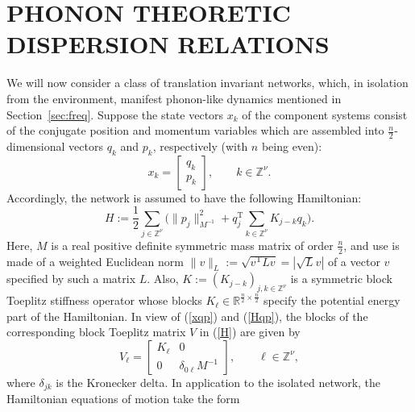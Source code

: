 \documentclass[letterpaper, 10pt, conference]{ieeeconf}  %
\def\mZ{\mathbb{Z}}    %
\def\mR{\mathbb{R}}    %
\def\rT{\mathrm{T}}        %
\def\x{\times}
\def\mZ{\mathbb{Z}}
\begin{document}
\section{PHONON THEORETIC
DISPERSION RELATIONS}\label{sec:phon}

We will now consider a class of translation invariant networks, which, in isolation from the environment, manifest phonon-like dynamics mentioned in Section~\ref{sec:freq}. Suppose the state vectors  $x_k$  of the component systems consist of the conjugate position and momentum variables which are assembled  into $\frac{n}{2}$-dimensional vectors $q_k$ and $p_k$, respectively (with $n$ being even):
\begin{equation}
\label{xqp}
    x_k
    =
    \begin{bmatrix}
        q_k\\
        p_k
    \end{bmatrix},
    \qquad
    k \in \mZ^\nu.
\end{equation}
Accordingly, the network is assumed to have the following Hamiltonian:
\begin{equation}
\label{Hqp}
    H
    :=
    \frac{1}{2}
    \sum_{j\in \mZ^\nu}
    \Big(
        \|p_j\|_{M^{-1}}^2
        +
        q_j^{\rT}
        \sum_{k\in \mZ^\nu}
        K_{j-k}
        q_k
    \Big).
\end{equation}
Here, $M$ is a real positive definite symmetric mass matrix of order $\frac{n}{2}$, and use is made of a weighted Euclidean norm $\|v\|_L := \sqrt{v^{\rT} L v} = |\sqrt{L}v|$ of a vector $v$ specified by such a matrix $L$. Also,
$K:=(K_{j-k})_{j,k\in \mZ^\nu}$ is a symmetric block Toeplitz stiffness operator whose blocks $K_{\ell} \in \mR^{\frac{n}{2}\x \frac{n}{2}}$ specify the potential energy part of the Hamiltonian. In view of (\ref{xqp}) and (\ref{Hqp}),  the blocks of the corresponding
block Toeplitz matrix $V$ in (\ref{H}) are given by
\begin{equation}
\label{VKM}
    V_{\ell}
    =
    \begin{bmatrix}
        K_\ell & 0\\
        0 & \delta_{0\ell}M^{-1}
    \end{bmatrix},
    \qquad
    \ell \in \mZ^\nu,
\end{equation}
where
$\delta_{jk}$ is the Kronecker delta. In application to the isolated network, the Hamiltonian equations of motion take the form
\end{document}
